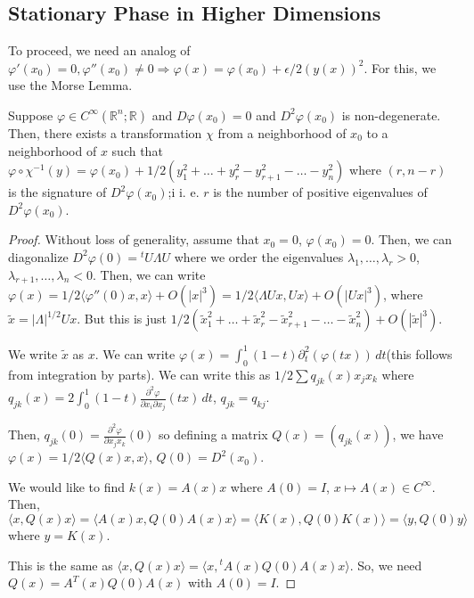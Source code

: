 \documentclass[12pt]{scrartcl}
\newcommand{\R}{\mathbb{R}}
\newcommand{\<}{\langle}
\renewcommand{\>}{\rangle}
\let \phi \varphi
\begin{document}
\subsection{Stationary Phase in Higher Dimensions}
To proceed, we need an analog of $\phi'(x_0) = 0, \phi''(x_0) \ne 0 \Rightarrow \phi(x) = \phi(x_0) + \epsilon/2(y(x))^2$.  For this, we use the Morse Lemma.
\begin{theorem} Suppose $\phi \in C^\infty(\R^n; \R)$ and $D\phi(x_0) = 0$ and $D^2\phi(x_0) $ is non-degenerate.  Then, there exists a transformation $\chi$ from a neighborhood of $x_0$ to a neighborhood of $x$ such that $\phi \circ \chi^{-1}(y) = \phi(x_0) + 1/2 (y_1^2 + \dots + y_r^2 - y_{r+1}^2 - \dots - y_n^2)$ where $(r, n-r)$ is the signature of $D^2\phi(x_0)$;i i. e. $r$ is the number of positive eigenvalues of $D^2 \phi(x_0)$. 
\end{theorem}
\begin{proof}
Without loss of generality, assume that $x_0 = 0$, $\phi(x_0) = 0$.  Then, we can diagonalize $D^2 \phi(0) = {}^t U \Lambda U$ where we order the eigenvalues $\lambda_1, \dots, \lambda_r > 0$, $\lambda_{r+1}, \dots, \lambda_n < 0$.  Then, we can write $\phi(x) = 1/2\<\phi''(0)x, x\> + O(|x|^3) = 1/2 \<\Lambda U x, U x\> + O(|Ux|^3)$, where $\tilde{x} = |\Lambda|^{1/2} U x$.  But this is just $1/2(\tilde{x}_1^2 + \dots + \tilde{x}_r^2 - \tilde{x}_{r+1}^2 - \dots - \tilde{x}_{n}^2) + O(|\tilde{x}|^3)$.

We write $\tilde{x}$ as $x$.  We can write $\phi(x) = \int_0^1 (1 - t)\partial_t^2(\phi(tx))\,dt$(this follows from integration by parts).  We can write this as $1/2 \sum q_{jk}(x) x_j x_k$ where $q_{jk}(x) = 2 \int_0^1 (1 - t) \frac{\partial^2 \phi}{\partial x_i \partial x_j}(tx)\,dt$, $q_{jk}  = q_{kj}$.

Then, $q_{jk}(0) = \frac{\partial^2\phi}{\partial x_j x_k}(0)$ so defining a matrix $Q(x) = (q_{jk}(x))$, we have $\phi(x) = 1/2 \<Q(x) x, x\>$, $Q(0) = D^2(x_0)$.  

We would like to find $k(x) = A(x) x$ where $A(0) = I$, $x \mapsto A(x) \in C^\infty$.  Then, $\<x, Q(x)x\> = \<A(x)x, Q(0) A(x)x\> = \<K(x), Q(0)K(x)\> = \<y, Q(0) y\>$ where $y = K(x)$.

This is the same as $\<x, Q(x) x\> = \<x, {}^t A(x) Q(0) A(x)x\>$.  So, we need $Q(x) = A^T(x)Q(0)A(x)$ with $A(0) = I$.

\end{proof}
\end{document}
